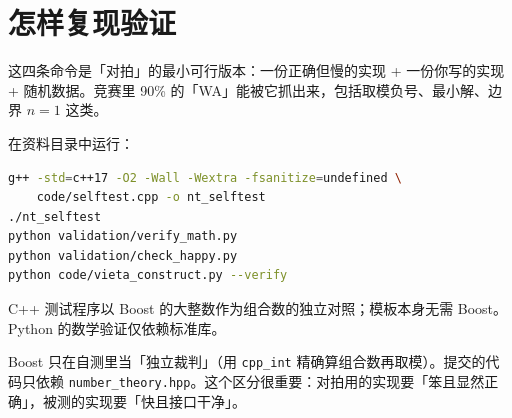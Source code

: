 \documentclass[UTF8,a4paper,11pt,oneside,openany,fontset=fandol]{ctexbook}
\theoremstyle{definition}
\begin{document}
\section{怎样复现验证}

\begin{tip}
这四条命令是「对拍」的最小可行版本：一份正确但慢的实现 + 一份你写的实现 + 随机数据。竞赛里 90\% 的「WA」能被它抓出来，包括取模负号、最小解、边界 $n=1$ 这类。
\end{tip}

在资料目录中运行：
\begin{lstlisting}[language=bash]
g++ -std=c++17 -O2 -Wall -Wextra -fsanitize=undefined \
    code/selftest.cpp -o nt_selftest
./nt_selftest
python validation/verify_math.py
python validation/check_happy.py
python code/vieta_construct.py --verify
\end{lstlisting}
C++ 测试程序以 Boost 的大整数作为组合数的独立对照；模板本身无需 Boost。Python 的数学验证仅依赖标准库。

\begin{tip}
Boost 只在自测里当「独立裁判」（用 \texttt{cpp\_int} 精确算组合数再取模）。提交的代码只依赖 \texttt{number\_theory.hpp}。这个区分很重要：对拍用的实现要「笨且显然正确」，被测的实现要「快且接口干净」。
\end{tip}

\end{document}
